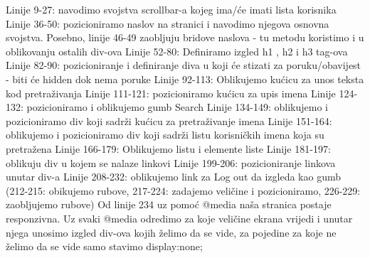 \documentclass{article}
\begin{document}
Linije 9-27: navodimo svojstva scrollbar-a kojeg ima/će imati lista korisnika
\newline\newline
Linije 36-50: pozicioniramo naslov na stranici i navodimo njegova osnovna svojstva. Posebno, linije 46-49 zaobljuju bridove naslova - tu metodu koristimo i u oblikovanju ostalih div-ova
\newline\newline
Linije 52-80: Definiramo izgled \nless h1  \ngtr, \nless h2 \ngtr i \nless h3 \ngtr tag-ova
\newline\newline
Linije 82-90: pozicioniranje i definiranje diva u koji će stizati za poruku/obavijest - biti će hidden dok nema poruke
\newline\newline
Linije 92-113: Oblikujemo kućicu za unos teksta kod pretraživanja
\newline\newline
Linije 111-121: pozicioniramo kućicu za upis imena
\newline\newline
Linije 124-132: pozicioniramo i oblikujemo gumb Search
\newline\newline
Linije 134-149: oblikujemo i pozicioniramo div koji sadrži kućicu za pretraživanje imena
\newline\newline
Linije 151-164: oblikujemo i pozicioniramo div koji sadrži listu korisničkih imena koja su pretražena
\newline\newline
Linije 166-179: Oblikujemo listu i elemente liste
\newline\newline
Linije 181-197: oblikuju div u kojem se nalaze linkovi
\newline\newline
Linije 199-206: pozicioniranje linkova unutar div-a
\newline\newline
Linije 208-232: oblikujemo link za Log out da izgleda kao gumb \newline(212-215: obikujemo rubove, 217-224: zadajemo veličine i pozicioniramo, 226-229: zaobljujemo rubove)
\newline\newline
Od linije 234 uz pomoć @media naša stranica postaje responzivna.
Uz svaki @media odredimo za koje veličine ekrana vrijedi i unutar njega unosimo izgled div-ova kojih želimo da se vide, za pojedine za koje ne želimo da se vide samo stavimo display:none;
\end{document}
